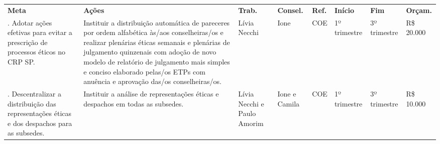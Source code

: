 \documentclass[%
    oneside,
    a4paper,
    landscape,
    8pt
]{memoir}
\begin{document}
\begin{longtable}[]{@{}
  >{\centering\arraybackslash}p{}
  >{\centering\arraybackslash}p{}
  >{\centering\arraybackslash}p{}
  >{\centering\arraybackslash}p{}
  >{\centering\arraybackslash}p{}
  >{\centering\arraybackslash}p{}
  >{\centering\arraybackslash}p{}
  >{\centering\arraybackslash}p{}@{}}
  \toprule\noalign{}
  \endhead
  \bottomrule\noalign{}
  \endlastfoot
  \textbf{Meta}                                                          & \textbf{Ações}                                               & \textbf{Trab.}       & \textbf{Consel.} &
  \textbf{Ref.}                                                          & \textbf{Início}                                              & \textbf{Fim}         & \textbf{Orçam.}                                      \\
  1. Adotar ações efetivas para evitar a prescrição de processos éticos no
  CRP SP.                                                                & Instituir a distribuição automática de pareceres por ordem
  alfabética às/aos conselheiras/os e realizar plenárias éticas semanais e
  plenárias de julgamento quinzenais com adoção de novo modelo de
  relatório de julgamento mais simples e conciso elaborado pelas/os ETPs
  com anuência e aprovação das/os conselheiras/os.                       & Lívia Necchi                                                 & Ione                 &
  COE                                                                    & 1º trimestre                                                 & 3º trimestre         & R\$ 20.000                                           \\
  2. Descentralizar a distribuição das representações éticas e dos
  despachos para as subsedes.                                            & Instituir a análise de representações
  éticas e despachos em todas as subsedes.                               & Lívia Necchi e Paulo Amorim                                  &
  Ione e Camila                                                          & COE                                                          & 1º trimestre         & 3º trimestre     & R\$ 10.000                        \\

\end{longtable}
\end{document}
